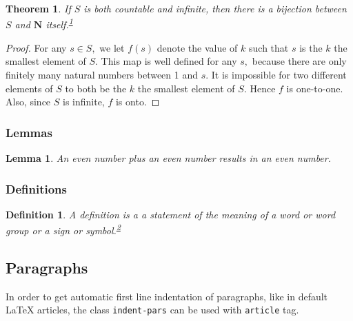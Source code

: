 \documentclass[
  11pt,
  a4paper,
]{article}
\newtheorem{lem}{Lemma}
\newtheorem{thm}{Theorem}
\newtheorem{dfn}{Definition}
\begin{document}
\begin{thm}

If \(S\) is both countable and infinite, then there is a bijection
between \(S\) and \(\boldsymbol{N}\)
itself.\textsuperscript{\label{ref1}\hyperref[fn1]{1}}

\end{thm}

\begin{proof}

For any \(s \in S,\) we let \(f(s)\) denote the value of \(k\) such that
\(s\) is the \(k\) the smallest element of \(S .\) This map is well
defined for any \(s,\) because there are only finitely many natural
numbers between 1 and \(s .\) It is impossible for two different
elements of \(S\) to both be the \(k\) the smallest element of \(S\).
Hence \(f\) is one-to-one. Also, since \(S\) is infinite, \(f\) is onto.

\end{proof}

\subsubsection{Lemmas}\label{lemmas}

\begin{lem}

An even number plus an even number results in an even number.

\end{lem}

\subsubsection{Definitions}\label{definitions}

\begin{dfn}

A definition is a a statement of the meaning of a word or word group or
a sign or
symbol.\textsuperscript{\label{ref2}\hyperref[fn2]{2}}

\end{dfn}

\subsection{Paragraphs}\label{paragraphs}

In order to get automatic first line indentation of paragraphs, like in
default {L{a}T{e}X} articles, the class
\lstinline!indent-pars! can be used with
\lstinline!article! tag.
\end{document}
